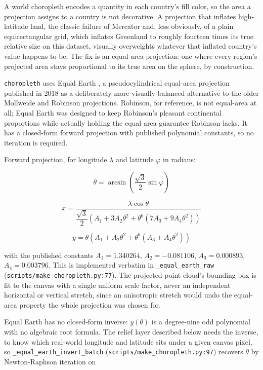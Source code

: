 \documentclass[11pt]{article}
\begin{document}
A world choropleth encodes a quantity in each country's fill color, so
the area a projection assigns to a country is not decorative. A
projection that inflates high-latitude land, the classic failure of
Mercator and, less obviously, of a plain equirectangular grid, which
inflates Greenland to roughly fourteen times its true relative size on
this dataset, visually overweights whatever that inflated country's
value happens to be. The fix is an equal-area projection: one where
every region's projected area stays proportional to its true area on
the sphere, by construction.

\texttt{choropleth} uses Equal Earth \autocite{savric-equal-earth}, a
pseudocylindrical equal-area projection published in 2018 as a
deliberately more visually balanced alternative to the older Mollweide
and Robinson projections. Robinson, for reference, is not equal-area at
all; Equal Earth was designed to keep Robinson's pleasant continental
proportions while actually holding the equal-area guarantee Robinson
lacks. It has a closed-form forward projection with published
polynomial constants, so no iteration is required.

Forward projection, for longitude $\lambda$ and latitude $\varphi$ in
radians:

\[
\theta = \arcsin\!\left(\frac{\sqrt{3}}{2}\sin\varphi\right)
\]

\[
x = \frac{\lambda \cos\theta}{\dfrac{\sqrt3}{2}\left(A_1 + 3A_2\theta^2 + \theta^6\left(7A_3 + 9A_4\theta^2\right)\right)}
\]

\[
y = \theta\left(A_1 + A_2\theta^2 + \theta^6\left(A_3 + A_4\theta^2\right)\right)
\]

with the published constants $A_1 = 1.340264$, $A_2 = -0.081106$,
$A_3 = 0.000893$, $A_4 = 0.003796$. This is implemented verbatim in
\texttt{\_equal\_earth\_raw} (\texttt{scripts/make\_choropleth.py:77}). The
projected point cloud's bounding box is fit to the canvas with a single
uniform scale factor, never an independent horizontal or vertical
stretch, since an anisotropic stretch would undo the equal-area property
the whole projection was chosen for.

Equal Earth has no closed-form inverse: $y(\theta)$ is a degree-nine odd
polynomial with no algebraic root formula. The relief layer described
below needs the inverse, to know which real-world longitude and
latitude sits under a given canvas pixel, so
\texttt{\_equal\_earth\_invert\_batch}
(\texttt{scripts/make\_choropleth.py:97}) recovers $\theta$ by
Newton-Raphson iteration on
\end{document}
